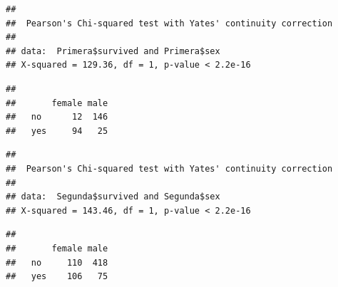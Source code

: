 \documentclass[
]{book}
\newenvironment{Shaded}{\begin{snugshade}}{\end{snugshade}}
\newcommand{\CommentTok}[1]{\textcolor[rgb]{0.56,0.35,0.01}{\textit{#1}}}
\newcommand{\FunctionTok}[1]{\textcolor[rgb]{0.00,0.00,0.00}{#1}}
\newcommand{\NormalTok}[1]{#1}
\newcommand{\SpecialCharTok}[1]{\textcolor[rgb]{0.00,0.00,0.00}{#1}}
\begin{document}
\begin{verbatim}
## 
##  Pearson's Chi-squared test with Yates' continuity correction
## 
## data:  Primera$survived and Primera$sex
## X-squared = 129.36, df = 1, p-value < 2.2e-16
\end{verbatim}

\begin{Shaded}
\end{Shaded}

\begin{verbatim}
##      
##       female male
##   no      12  146
##   yes     94   25
\end{verbatim}

\begin{Shaded}
\end{Shaded}

\begin{verbatim}
## 
##  Pearson's Chi-squared test with Yates' continuity correction
## 
## data:  Segunda$survived and Segunda$sex
## X-squared = 143.46, df = 1, p-value < 2.2e-16
\end{verbatim}

\begin{Shaded}
\end{Shaded}

\begin{verbatim}
##      
##       female male
##   no     110  418
##   yes    106   75
\end{verbatim}

\begin{Shaded}
\end{Shaded}
\end{document}
